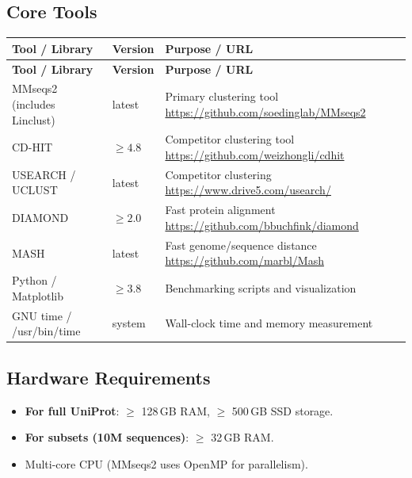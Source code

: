 \documentclass[11pt,a4paper]{article}
\begin{document}
\subsection{Core Tools}
\begin{longtable}{p{4.5cm} p{2.5cm} p{6.5cm}}
\toprule
\textbf{Tool / Library} & \textbf{Version} & \textbf{Purpose / URL} \\
\midrule
\endfirsthead
\toprule
\textbf{Tool / Library} & \textbf{Version} & \textbf{Purpose / URL} \\
\midrule
\endhead
MMseqs2 (includes Linclust) & latest & Primary clustering tool \newline \url{https://github.com/soedinglab/MMseqs2} \\
\midrule
CD-HIT & $\geq 4.8$ & Competitor clustering tool \newline \url{https://github.com/weizhongli/cdhit} \\
\midrule
USEARCH / UCLUST & latest & Competitor clustering \newline \url{https://www.drive5.com/usearch/} \\
\midrule
DIAMOND & $\geq 2.0$ & Fast protein alignment \newline \url{https://github.com/bbuchfink/diamond} \\
\midrule
MASH & latest & Fast genome/sequence distance \newline \url{https://github.com/marbl/Mash} \\
\midrule
Python / Matplotlib & $\geq 3.8$ & Benchmarking scripts and visualization \\
\midrule
GNU time / /usr/bin/time & system & Wall-clock time and memory measurement \\
\bottomrule
\end{longtable}

\subsection{Hardware Requirements}
\begin{itemize}
  \item \textbf{For full UniProt}: $\geq$ 128\,GB RAM, $\geq$ 500\,GB SSD storage.
  \item \textbf{For subsets (10M sequences)}: $\geq$ 32\,GB RAM.
  \item Multi-core CPU (MMseqs2 uses OpenMP for parallelism).
\end{itemize}
\end{document}
